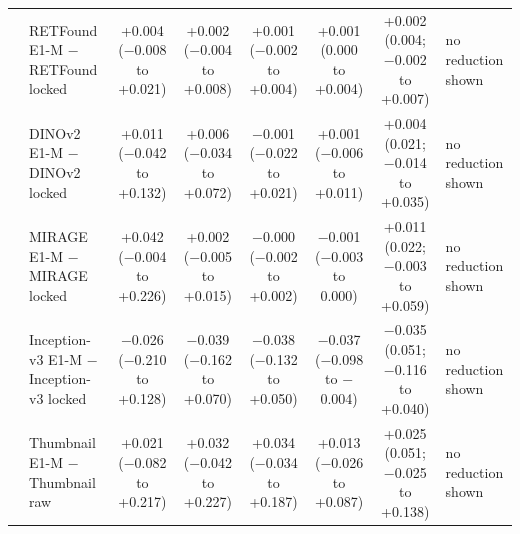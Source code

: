 \begin{longtable}{@{}llcccccp{3cm}@{}}
 & RETFound E1-M $-$ RETFound locked & \makecell{+0.004\\{\scriptsize ($-$0.008 to +0.021)}} & \makecell{+0.002\\{\scriptsize ($-$0.004 to +0.008)}} & \makecell{+0.001\\{\scriptsize ($-$0.002 to +0.004)}} & \makecell{+0.001\\{\scriptsize (0.000 to +0.004)}} & \makecell{+0.002\\{\scriptsize (0.004; $-$0.002 to +0.007)}} & no reduction shown \\
 & DINOv2 E1-M $-$ DINOv2 locked & \makecell{+0.011\\{\scriptsize ($-$0.042 to +0.132)}} & \makecell{+0.006\\{\scriptsize ($-$0.034 to +0.072)}} & \makecell{$-$0.001\\{\scriptsize ($-$0.022 to +0.021)}} & \makecell{+0.001\\{\scriptsize ($-$0.006 to +0.011)}} & \makecell{+0.004\\{\scriptsize (0.021; $-$0.014 to +0.035)}} & no reduction shown \\
 & MIRAGE E1-M $-$ MIRAGE locked & \makecell{+0.042\\{\scriptsize ($-$0.004 to +0.226)}} & \makecell{+0.002\\{\scriptsize ($-$0.005 to +0.015)}} & \makecell{$-$0.000\\{\scriptsize ($-$0.002 to +0.002)}} & \makecell{$-$0.001\\{\scriptsize ($-$0.003 to 0.000)}} & \makecell{+0.011\\{\scriptsize (0.022; $-$0.003 to +0.059)}} & no reduction shown \\
 & Inception-v3 E1-M $-$ Inception-v3 locked & \makecell{$-$0.026\\{\scriptsize ($-$0.210 to +0.128)}} & \makecell{$-$0.039\\{\scriptsize ($-$0.162 to +0.070)}} & \makecell{$-$0.038\\{\scriptsize ($-$0.132 to +0.050)}} & \makecell{$-$0.037\\{\scriptsize ($-$0.098 to $-$0.004)}} & \makecell{$-$0.035\\{\scriptsize (0.051; $-$0.116 to +0.040)}} & no reduction shown \\
 & Thumbnail E1-M $-$ Thumbnail raw & \makecell{+0.021\\{\scriptsize ($-$0.082 to +0.217)}} & \makecell{+0.032\\{\scriptsize ($-$0.042 to +0.227)}} & \makecell{+0.034\\{\scriptsize ($-$0.034 to +0.187)}} & \makecell{+0.013\\{\scriptsize ($-$0.026 to +0.087)}} & \makecell{+0.025\\{\scriptsize (0.051; $-$0.025 to +0.138)}} & no reduction shown \\

\end{longtable}
